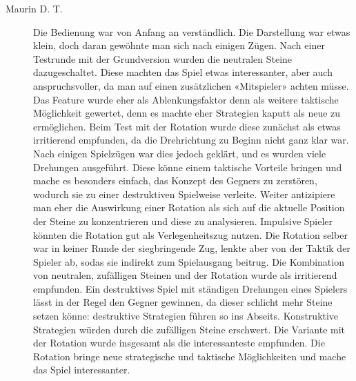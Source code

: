 \documentclass[a4paper,11pt,hidelinks]{scrartcl}
\begin{document}
\begin{description}
    \item[Maurin D. T.] Die Bedienung war von Anfang an verständlich. Die Darstellung war etwas klein, doch daran gewöhnte man sich nach einigen Zügen. Nach einer Testrunde mit der Grundversion wurden die neutralen Steine dazugeschaltet. Diese machten das Spiel etwas interessanter, aber auch anspruchsvoller, da man auf einen zusätzlichen «Mitspieler» achten müsse. Das Feature wurde eher als Ablenkungsfaktor denn als weitere taktische Möglichkeit gewertet, denn es machte eher Strategien kaputt als neue zu ermöglichen. Beim Test mit der Rotation wurde diese zunächst als etwas irritierend empfunden, da die Drehrichtung zu Beginn nicht ganz klar war. Nach einigen Spielzügen war dies jedoch geklärt, und es wurden viele Drehungen ausgeführt. Diese könne einem taktische Vorteile bringen und mache es besonders einfach, das Konzept des Gegners zu zerstören, wodurch sie zu einer destruktiven Spielweise verleite. Weiter antizipiere man eher die Auswirkung einer Rotation als sich auf die aktuelle Position der Steine zu konzentrieren und diese zu analysieren. Impulsive Spieler könnten die Rotation gut als Verlegenheitszug nutzen. Die Rotation selber war in keiner Runde der siegbringende Zug, lenkte aber von der Taktik der Spieler ab, sodas sie indirekt zum Spielausgang beitrug. Die Kombination von neutralen, zufälligen Steinen und der Rotation wurde als irritierend empfunden. Ein destruktives Spiel mit ständigen Drehungen eines Spielers lässt in der Regel den Gegner gewinnen, da dieser schlicht mehr Steine setzen könne: destruktive Strategien führen so ins Abseits. Konstruktive Strategien würden durch die zufälligen Steine erschwert. Die Variante mit der Rotation wurde insgesamt als die interessanteste empfunden. Die Rotation bringe neue strategische und taktische Möglichkeiten und mache das Spiel interessanter.

\end{description}
\end{document}
